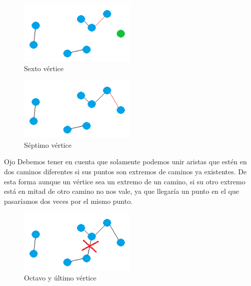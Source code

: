 \begin{frame}
	\begin{exampleblock}{ }
	\begin{figure}[htbH] 
		\centering
		\includegraphics[width=0.5\textwidth]{./Imagenes/arista5.png}
		\caption{Sexto vértice} 
	\end{figure}
	\end{exampleblock}
\end{frame}

\begin{frame}
	\begin{exampleblock}{ }
	\begin{figure}[htbH] 
		\centering
		\includegraphics[width=0.5\textwidth]{./Imagenes/arista6.png}
		\caption{Séptimo vértice} 
	\end{figure}
	\end{exampleblock}
\end{frame}

\begin{frame}
	\begin{alertblock}{Ojo} 
	Debemos tener en cuenta que solamente podemos unir aristas que estén en dos caminos 
	diferentes si sus puntos son extremos de caminos ya existentes. De esta forma aunque 
	un vértice sea un extremo de un camino, si su otro extremo está en mitad de otro 
	camino no nos vale, ya que llegaría un punto en el que pasaríamos dos veces por el 
	mismo punto.
	\end{alertblock}
\end{frame}

\begin{frame}
	\begin{exampleblock}{ }
	\begin{figure}[htbH] 
		\centering
		\includegraphics[width=0.5\textwidth]{./Imagenes/arista6fail.png}
		\caption{Octavo y último vértice} 
	\end{figure}
	\end{exampleblock}
\end{frame}		
	

